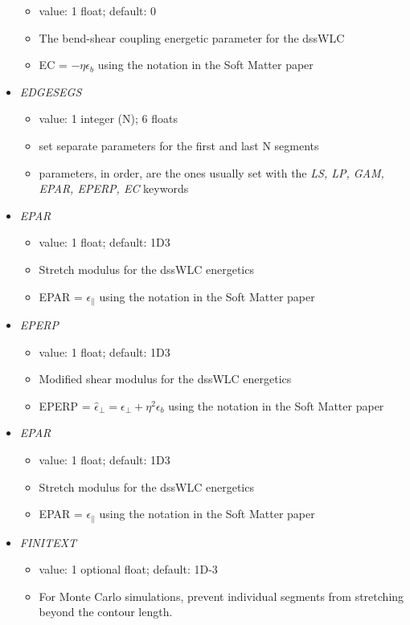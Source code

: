 \documentclass[12pt]{article}
\begin{document}
\begin{itemize}
\begin{itemize}
    \item  value: 1 float; default: 0
    \item The bend-shear coupling energetic parameter for the dssWLC
    \item EC = $-\eta\epsilon_b$ using the notation in the Soft Matter paper
  \end{itemize}
%
\item {\it EDGESEGS}
  \begin{itemize}
    \item  value: 1 integer (N); 6 floats
    \item set separate parameters for the first and last N segments
    \item parameters, in order, are the ones usually set with the {\em LS, LP, GAM, EPAR, EPERP, EC} keywords
  \end{itemize}
%
\item {\it EPAR}
  \begin{itemize}
    \item  value: 1 float; default: 1D3
    \item Stretch modulus for the dssWLC energetics
    \item EPAR = $\epsilon_\parallel$ using the notation in the Soft Matter paper
  \end{itemize}
%
\item {\it EPERP}
  \begin{itemize}
    \item  value: 1 float; default: 1D3
    \item Modified shear modulus for the dssWLC energetics
    \item EPERP = $\hat{\epsilon}_\perp = \epsilon_\perp + \eta^2\epsilon_b$ using the notation in the Soft Matter paper
  \end{itemize}
%
\item {\it EPAR}
  \begin{itemize}
    \item  value: 1 float; default: 1D3
    \item Stretch modulus for the dssWLC energetics
    \item EPAR = $\epsilon_\parallel$ using the notation in the Soft Matter paper
  \end{itemize}
%
\item {\it FINITEXT}
  \begin{itemize}
    \item  value: 1 optional float; default: 1D-3
    \item For Monte Carlo simulations, prevent individual segments from stretching beyond the contour length.

\end{itemize}
\end{itemize}
\end{document}
